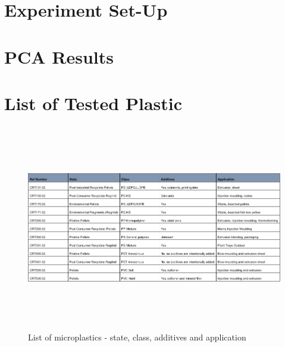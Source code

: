 \begin{appendices}

\chapter{Experiment Set-Up}
\label{app:method}


\chapter{PCA Results}
\label{app:PCA_res_full}

\chapter{List of Tested Plastic}
\label{app:list_plast}




\begin{figure}
    \centering
    \includegraphics[height = 9cm, angle = 90]{Images/order.png}
    \caption{List of microplastics - state, class, additives and application}
    \label{fig:order}
\end{figure}





\end{appendices}
